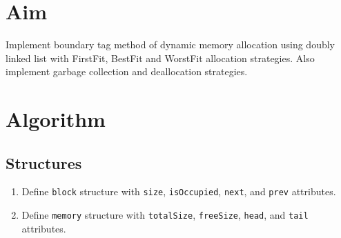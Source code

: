 
\section{Aim}
Implement boundary tag method of dynamic memory allocation using doubly linked list with FirstFit, BestFit and WorstFit allocation strategies. Also implement garbage collection and deallocation strategies.

\section{Algorithm}

\subsection{Structures}
\begin{enumerate}[label=\arabic*.,left=0pt]
  \item Define \texttt{block} structure with \texttt{size}, \texttt{isOccupied}, \texttt{next}, and \texttt{prev} attributes.
  \item Define \texttt{memory} structure with \texttt{totalSize}, \texttt{freeSize}, \texttt{head}, and \texttt{tail} attributes.
\end{enumerate}

